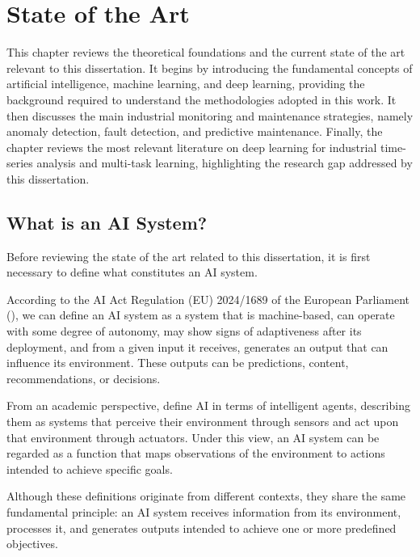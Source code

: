
\chapter{State of the Art}\label{chap:sota}

This chapter reviews the theoretical foundations and the current state of the art relevant to this dissertation. It begins by introducing the fundamental 
concepts of artificial intelligence, machine learning, and deep learning, providing the background required to understand the methodologies adopted in this work. 
It then discusses the main industrial monitoring and maintenance strategies, namely anomaly detection, fault detection, and predictive maintenance. Finally, the 
chapter reviews the most relevant literature on deep learning for industrial time-series analysis and multi-task learning, highlighting the research gap addressed 
by this dissertation.


\section{What is an AI System?} \label{sec:artificialinteligence}

Before reviewing the state of the art related to this dissertation, it is first necessary to define what constitutes an AI system.

According to the AI Act Regulation (EU) 2024/1689 of the European Parliament (\cite{European2025}), 
we can define an AI system as a system that is machine-based, can operate with some degree of autonomy,
may show signs of adaptiveness after its deployment, and from a given input it receives, 
generates an output that can influence its environment. These outputs can be predictions, 
content, recommendations, or decisions.

From an academic perspective, \cite{Russell2016} define AI in terms of 
intelligent agents, describing them as systems that perceive their environment through sensors and 
act upon that environment through actuators. Under this view, an AI system can be regarded 
as a function that maps observations of the environment to actions intended to achieve specific goals.

Although these definitions originate from different contexts, they share the same fundamental principle: an AI system receives information from its environment, processes it, 
and generates outputs intended to achieve one or more predefined objectives.

